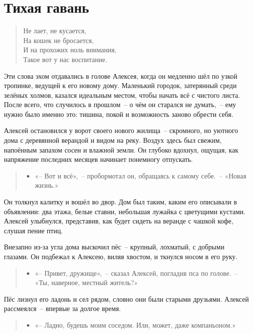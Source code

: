 \documentclass[12pt,a4paper]{book}
\newenvironment{dialogue}{\begin{quote}\itshape\begin{itemize}\item[]}{\end{itemize}\end{quote}}
\begin{document}
\chapter{Тихая гавань}

\begin{verse}
Не лает, не кусается,\\
На кошек не бросается,\\
И на прохожих ноль внимания,\\
Такое вот у нас воспитание.
\end{verse}

Эти слова эхом отдавались в голове Алексея, когда он медленно шёл по узкой тропинке, ведущей к его новому дому. Маленький городок, затерянный среди зелёных холмов, казался идеальным местом, чтобы начать всё с чистого листа. После всего, что случилось в прошлом~-- о чём он старался не думать,~-- ему нужно было именно это: тишина, покой и возможность заново обрести себя.

Алексей остановился у ворот своего нового жилища~-- скромного, но уютного дома с деревянной верандой и видом на реку. Воздух здесь был свежим, напоённым запахом сосен и влажной земли. Он глубоко вдохнул, ощущая, как напряжение последних месяцев начинает понемногу отпускать.

\begin{dialogue}
«-- Вот и всё»,~-- пробормотал он, обращаясь к самому себе.~-- «Новая жизнь.»
\end{dialogue}

Он толкнул калитку и вошёл во двор. Дом был таким, каким его описывали в объявлении: два этажа, белые ставни, небольшая лужайка с цветущими кустами. Алексей улыбнулся, представив, как будет сидеть на веранде с чашкой кофе, слушая пение птиц.

Внезапно из-за угла дома выскочил пёс~-- крупный, лохматый, с добрыми глазами. Он подбежал к Алексею, виляя хвостом, и ткнулся носом в его руку.

\begin{dialogue}
«-- Привет, дружище»,~-- сказал Алексей, погладив пса по голове.~-- «Ты, наверное, местный житель?»
\end{dialogue}

Пёс лизнул его ладонь и сел рядом, словно они были старыми друзьями. Алексей рассмеялся~-- впервые за долгое время.

\begin{dialogue}
«-- Ладно, будешь моим соседом. Или, может, даже компаньоном.»
\end{dialogue}
\end{document}
